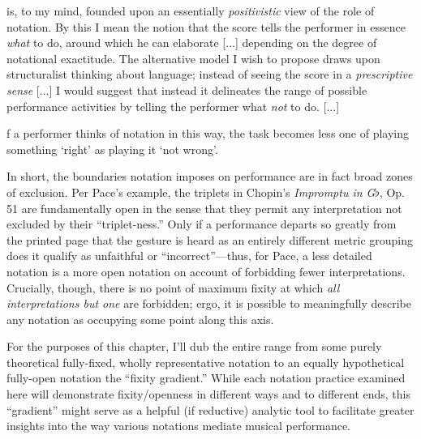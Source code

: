         \begin{smallquote}
             is, to my mind, founded upon an essentially \textit{positivistic} view of the role of notation. By this I mean the notion that the score tells the performer in essence \textit{what} to do, around which he can elaborate [...] depending on the degree of notational exactitude. The alternative model I wish to propose draws upon structuralist thinking about language; instead of seeing the score in a \textit{prescriptive sense} [...] I would suggest that instead it delineates the range of possible performance activities by telling the performer what \textit{not} to do. [...]

            \vspace{7pt}
            
            \noindent[I]f a performer thinks of notation in this way, the task becomes less one of playing something `right' as playing it `not wrong'.
        \end{smallquote}

    In short, the boundaries notation imposes on performance are in fact broad zones of exclusion. Per Pace's example, the triplets in Chopin's \textit{Impromptu in G$\flat$}, Op. 51 are fundamentally open in the sense that they permit any interpretation not excluded by their ``triplet-ness.'' Only if a performance departs so greatly from the printed page that the gesture is heard as an entirely different metric grouping does it qualify as unfaithful or ``incorrect''---thus, for Pace, a less detailed notation is a more open notation on account of forbidding fewer interpretations.\autocite[154--6]{Pace_2009} Crucially, though, there is no point of maximum fixity at which \textit{all interpretations but one} are forbidden; ergo, it is possible to meaningfully describe any notation as occupying some point along this axis.
    

    For the purposes of this chapter, I'll dub the entire range from some purely theoretical fully-fixed, wholly representative notation to an equally hypothetical fully-open notation the ``fixity gradient.'' While each notation practice examined here will demonstrate fixity/openness in different ways and to different ends, this ``gradient'' might serve as a helpful (if reductive) analytic tool to facilitate greater insights into the way various notations mediate musical performance.

